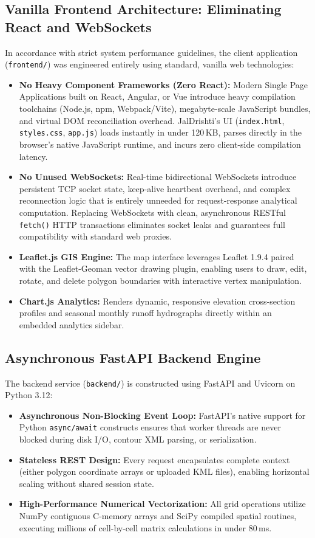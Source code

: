 \documentclass[11pt,a4paper]{article}
\begin{document}
\subsection{Vanilla Frontend Architecture: Eliminating React and WebSockets}
In accordance with strict system performance guidelines, the client application (\texttt{frontend/}) was engineered entirely using standard, vanilla web technologies:
\begin{itemize}[noitemsep,topsep=2pt]
    \item \textbf{No Heavy Component Frameworks (Zero React):} Modern Single Page Applications built on React, Angular, or Vue introduce heavy compilation toolchains (Node.js, npm, Webpack/Vite), megabyte-scale JavaScript bundles, and virtual DOM reconciliation overhead. JalDrishti's UI (\texttt{index.html}, \texttt{styles.css}, \texttt{app.js}) loads instantly in under 120\,KB, parses directly in the browser's native JavaScript runtime, and incurs zero client-side compilation latency.
    \item \textbf{No Unused WebSockets:} Real-time bidirectional WebSockets introduce persistent TCP socket state, keep-alive heartbeat overhead, and complex reconnection logic that is entirely unneeded for request-response analytical computation. Replacing WebSockets with clean, asynchronous RESTful \texttt{fetch()} HTTP transactions eliminates socket leaks and guarantees full compatibility with standard web proxies.
    \item \textbf{Leaflet.js GIS Engine:} The map interface leverages Leaflet 1.9.4 paired with the Leaflet-Geoman vector drawing plugin, enabling users to draw, edit, rotate, and delete polygon boundaries with interactive vertex manipulation.
    \item \textbf{Chart.js Analytics:} Renders dynamic, responsive elevation cross-section profiles and seasonal monthly runoff hydrographs directly within an embedded analytics sidebar.
\end{itemize}

\subsection{Asynchronous FastAPI Backend Engine}
The backend service (\texttt{backend/}) is constructed using FastAPI and Uvicorn on Python 3.12:
\begin{itemize}[noitemsep,topsep=2pt]
    \item \textbf{Asynchronous Non-Blocking Event Loop:} FastAPI's native support for Python \texttt{async/await} constructs ensures that worker threads are never blocked during disk I/O, contour XML parsing, or serialization.
    \item \textbf{Stateless REST Design:} Every request encapsulates complete context (either polygon coordinate arrays or uploaded KML files), enabling horizontal scaling without shared session state.
    \item \textbf{High-Performance Numerical Vectorization:} All grid operations utilize NumPy contiguous C-memory arrays and SciPy compiled spatial routines, executing millions of cell-by-cell matrix calculations in under 80\,ms.
\end{itemize}
\end{document}
